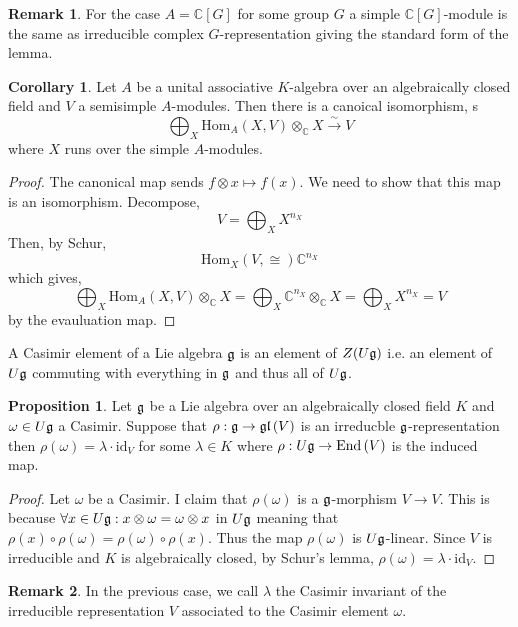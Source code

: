 \documentclass[12pt]{extarticle}
\newcommand{\C}{\mathbb{C}}
\newcommand{\id}{\mathrm{id}}
\newcommand{\catHom}[3]{\mathrm{Hom}_{#1}\left( #2, #3 \right)}
\theoremstyle{definition}
\newtheorem{proposition}[theorem]{Proposition}
\newtheorem{corollary}[theorem]{Corollary}
\newtheorem{remark}{Remark}
\newenvironment{definition}[1][Definition:]{\begin{trivlist}
\item[\hskip \labelsep {\bfseries #1}]}{\end{trivlist}}
\newcommand{\End}[1]{\mathrm{End}\left( #1 \right)}
\begin{document}
\begin{remark}
For the case $A = \C[G]$ for some group $G$ a simple $\C[G]$-module is the same as irreducible complex $G$-representation giving the standard form of the lemma. 
\end{remark}

\begin{corollary}
Let $A$ be a unital associative $K$-algebra over an algebraically closed field and $V$  a semisimple $A$-modules. Then there is a canoical isomorphism,
s\[ \bigoplus_X \catHom{A}{X}{V} \otimes_\C X \xrightarrow{\sim} V \] 
where $X$ runs over the simple $A$-modules.
\end{corollary}

\begin{proof}
The canonical map sends $f \otimes x \mapsto f(x)$. We need to show that this map is an isomorphism. Decompose,
\[ V = \bigoplus_{X} X^{n_X} \]
Then, by Schur,
\[ \catHom{X}{V} \cong \C^{n_X} \] 
which gives,
\[ \bigoplus_X \catHom{A}{X}{V} \otimes_\C X = \bigoplus_X \C^{n_X} \otimes_\C X = \bigoplus_X X^{n_X}  = V \]
by the evauluation map. 
\end{proof}

\begin{definition}
A Casimir element of a Lie algebra $\mathfrak{g}$ is an element of $Z(U \mathfrak{g})$ i.e. an element of $U \mathfrak{g}$ commuting with everything in $\mathfrak{g}$ and thus all of $U \mathfrak{g}$. 
\end{definition}

\begin{proposition}
Let $\mathfrak{g}$ be a Lie algebra over an algebraically closed field $K$ and $\omega \in U \mathfrak{g}$ a Casimir. Suppose that $\rho : \mathfrak{g} \to \mathfrak{gl}\left( V \right)$ is an irreducble $\mathfrak{g}$-representation then $\rho(\omega) = \lambda \cdot \id_V$ for some $\lambda \in K$ where $\rho : U \g \to \End{V}$ is the induced map.
\end{proposition}

\begin{proof}
Let $\omega$ be a Casimir. I claim that $\rho(\omega)$ is a $\mathfrak{g}$-morphism $V \to V$. This is because $\forall x \in U \mathfrak{g} : x \otimes \omega = \omega \otimes x$ in $U \mathfrak{g}$ meaning that $\rho(x) \circ \rho(\omega) = \rho(\omega) \circ \rho(x)$. Thus the map $\rho(\omega)$ is $U \mathfrak{g}$-linear. Since $V$ is irreducible and $K$ is algebraically closed, by Schur's lemma, $\rho(\omega) = \lambda \cdot \id_V$. 
\end{proof}

\begin{remark}
In the previous case, we call $\lambda$ the Casimir invariant of the irreducible representation $V$ associated to the Casimir element $\omega$.
\end{remark}
\end{document}
